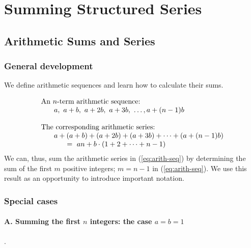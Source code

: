 \section{Summing Structured Series}
\label{sec:structured-series}

\subsection{Arithmetic Sums and Series}
\label{sec:arithmetic-series}

\subsubsection{General development}

We define arithmetic sequences and learn how to calculate their sums.

\begin{equation}
\label{eq:arith-seq}
\begin{array}{l}
\mbox{An $n$-term arithmetic sequence:} \\
\hspace*{.25in}a, \ a+b, \ a+2b, \ a+3b, \ \ldots, a+(n-1)b \\
\\
\mbox{The corresponding arithmetic series:} \\
\hspace*{.25in}a + (a+b) + (a+2b) + (a+3b) + \cdots + (a+(n-1)b) \\
\hspace*{.5in} = \
an + b \cdot (1 + 2 + \cdots + n-1)
\end{array}
\end{equation}
We can, thus, sum the arithmetic series in (\ref{eq:arith-seq}) by
determining the sum of the first $m$ positive integers; $m = n-1$ in
(\ref{eq:arith-seq}).  We use this result as an opportunity to
introduce important notation.

\subsubsection{Special cases}


\paragraph{\small\sf A. Summing the first $n$ integers: the case $a=b=1$}.

